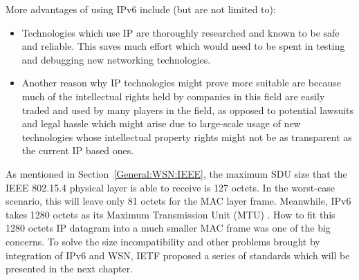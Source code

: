 More advantages of using IPv6 include (but are not limited to):  
\begin{itemize}
 
\item Technologies which use IP are thoroughly researched and known to be safe and reliable.  This saves much effort which would need to be spent in testing and debugging new networking technologies. 

\item Another reason why IP technologies might prove more suitable are because much of the intellectual rights held by companies in this field are easily traded and used by many players in the field, as opposed to potential lawsuits and legal hassle which might arise due to large-scale usage of new technologies whose intellectual property rights might not be as transparent as the current IP based ones.

\end{itemize}

As mentioned in Section~\ref{General:WSN:IEEE}, the maximum SDU size that the IEEE 802.15.4 physical layer is able to receive is 127 octets. In the worst-case scenario, this will leave only 81 \nolinebreak octets for the MAC layer frame. Meanwhile, IPv6 takes 1280 octets as its Maximum Transmission Unit (MTU) \cite{RFC 4919}. How to fit this 1280 octets IP datagram into a much smaller MAC frame was one of the big concerns. To solve the  size incompatibility and other problems brought by integration of IPv6 and WSN, IETF proposed a series of standards which will be presented in the next chapter.

